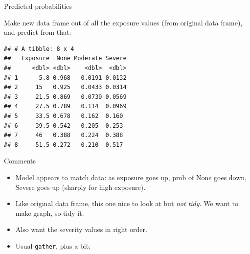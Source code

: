 \documentclass[
  ignorenonframetext,
]{beamer}
\newenvironment{Shaded}{\begin{snugshade}}{\end{snugshade}}
\newcommand{\DataTypeTok}[1]{\textcolor[rgb]{0.13,0.29,0.53}{#1}}
\newcommand{\FloatTok}[1]{\textcolor[rgb]{0.00,0.00,0.81}{#1}}
\newcommand{\KeywordTok}[1]{\textcolor[rgb]{0.13,0.29,0.53}{\textbf{#1}}}
\newcommand{\NormalTok}[1]{#1}
\newcommand{\OperatorTok}[1]{\textcolor[rgb]{0.81,0.36,0.00}{\textbf{#1}}}
\newcommand{\StringTok}[1]{\textcolor[rgb]{0.31,0.60,0.02}{#1}}
\begin{document}
\begin{frame}[fragile]{Predicted probabilities}
\protect\hypertarget{predicted-probabilities}{}

Make new data frame out of all the exposure values (from original data
frame), and predict from that:

\begin{Shaded}
\end{Shaded}

\begin{verbatim}
## # A tibble: 8 x 4
##   Exposure  None Moderate Severe
##      <dbl> <dbl>    <dbl>  <dbl>
## 1      5.8 0.968   0.0191 0.0132
## 2     15   0.925   0.0433 0.0314
## 3     21.5 0.869   0.0739 0.0569
## 4     27.5 0.789   0.114  0.0969
## 5     33.5 0.678   0.162  0.160 
## 6     39.5 0.542   0.205  0.253 
## 7     46   0.388   0.224  0.388 
## 8     51.5 0.272   0.210  0.517
\end{verbatim}

\end{frame}

\begin{frame}[fragile]{Comments}
\protect\hypertarget{comments-15}{}

\begin{itemize}
\item
  Model appears to match data: as exposure goes up, prob of None goes
  down, Severe goes up (sharply for high exposure).
\item
  Like original data frame, this one nice to look at but \emph{not
  tidy}. We want to make graph, so tidy it.
\item
  Also want the severity values in right order.
\item
  Usual \texttt{gather}, plus a bit:
\end{itemize}

\begin{Shaded}
\end{Shaded}

\end{frame}
\end{document}
